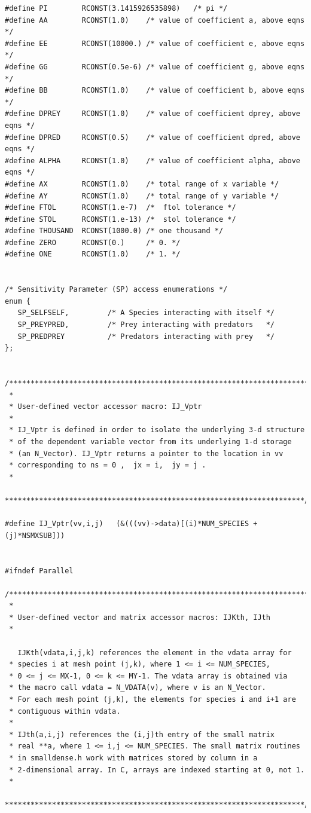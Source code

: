\documentclass[11pt]{article}
\begin{document}
\begin{verbatim}
#define PI        RCONST(3.1415926535898)   /* pi */
#define AA        RCONST(1.0)    /* value of coefficient a, above eqns */
#define EE        RCONST(10000.) /* value of coefficient e, above eqns */
#define GG        RCONST(0.5e-6) /* value of coefficient g, above eqns */
#define BB        RCONST(1.0)    /* value of coefficient b, above eqns */
#define DPREY     RCONST(1.0)    /* value of coefficient dprey, above eqns */
#define DPRED     RCONST(0.5)    /* value of coefficient dpred, above eqns */
#define ALPHA     RCONST(1.0)    /* value of coefficient alpha, above eqns */
#define AX        RCONST(1.0)    /* total range of x variable */
#define AY        RCONST(1.0)    /* total range of y variable */
#define FTOL      RCONST(1.e-7)  /*  ftol tolerance */
#define STOL      RCONST(1.e-13) /*  stol tolerance */
#define THOUSAND  RCONST(1000.0) /* one thousand */
#define ZERO      RCONST(0.)     /* 0. */
#define ONE       RCONST(1.0)    /* 1. */


/* Sensitivity Parameter (SP) access enumerations */
enum {
   SP_SELFSELF,         /* A Species interacting with itself */
   SP_PREYPRED,         /* Prey interacting with predators   */
   SP_PREDPREY          /* Predators interacting with prey   */
};


/***********************************************************************
 *
 * User-defined vector accessor macro: IJ_Vptr
 *
 * IJ_Vptr is defined in order to isolate the underlying 3-d structure
 * of the dependent variable vector from its underlying 1-d storage
 * (an N_Vector). IJ_Vptr returns a pointer to the location in vv
 * corresponding to ns = 0 ,  jx = i,  jy = j .
 *
 **********************************************************************/

#define IJ_Vptr(vv,i,j)   (&(((vv)->data)[(i)*NUM_SPECIES + (j)*NSMXSUB]))


#ifndef Parallel

/***********************************************************************
 *
 * User-defined vector and matrix accessor macros: IJKth, IJth
 *

   IJKth(vdata,i,j,k) references the element in the vdata array for
 * species i at mesh point (j,k), where 1 <= i <= NUM_SPECIES,
 * 0 <= j <= MX-1, 0 <= k <= MY-1. The vdata array is obtained via
 * the macro call vdata = N_VDATA(v), where v is an N_Vector.
 * For each mesh point (j,k), the elements for species i and i+1 are
 * contiguous within vdata.
 *
 * IJth(a,i,j) references the (i,j)th entry of the small matrix
 * real **a, where 1 <= i,j <= NUM_SPECIES. The small matrix routines
 * in smalldense.h work with matrices stored by column in a
 * 2-dimensional array. In C, arrays are indexed starting at 0, not 1.
 *
 **********************************************************************/


\end{verbatim}
\end{document}
